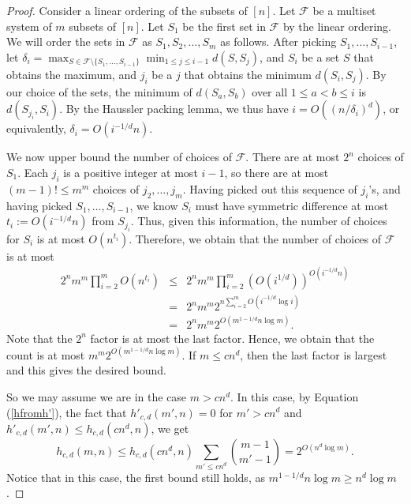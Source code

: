 \documentclass[11pt]{article}
\theoremstyle{plain}
\theoremstyle{definition}
\theoremstyle{remark}
\begin{document}
 
 \begin{proof} 
Consider a linear ordering of the subsets of $[n]$. Let $\mathcal{F}$ be a multiset system of $m$ subsets of $[n]$. Let $S_1$ be the first set in $\mathcal{F}$ by the linear ordering. We will order the sets in $\mathcal{F}$ as $S_1,S_2,\ldots,S_m$ as follows. After picking $S_1,\ldots,S_{i-1}$, let $\delta_i=\max_{S \in \mathcal{F} \setminus \{S_1,\ldots,S_{i-1}\}} \min_{1 \leq j \leq i-1} d(S,S_j)$, and $S_i$ be a set $S$ that obtains the maximum, and $j_i$ be a $j$ that obtains the minimum $d(S_i,S_j)$. By our choice of the sets, 
the minimum of $d(S_a,S_b)$ over all $1 \leq a < b \leq i$ is $d(S_{j_i},S_i)$. By the Haussler packing lemma, we thus have $i = O((n/\delta_i)^d)$, or equivalently, $\delta_i = O(i^{-1/d}n)$. 

We now upper bound the number of choices of $\mathcal{F}$. There are at most $2^n$ choices of $S_1$. Each $j_i$ is a positive integer at most $i-1$, so there are at most $(m-1)! \leq m^m$ choices of $j_2,\ldots,j_m$. Having picked out this sequence of $j_i$'s, and having picked $S_1,\ldots,S_{i-1}$, we know $S_i$ must have symmetric difference at most $t_i:=O(i^{-1/d}n)$ from $S_{j_i}$. Thus, given this information, the number of choices for $S_i$ is at most $O(n^{t_i})$. Therefore, we obtain that the number of choices of $\mathcal{F}$ is at most 
\begin{eqnarray*} 2^n m^m \prod_{i=2}^m O(n^{t_i}) & \leq &  2^n m^m \prod_{i=2}^m (O(i^{1/d}))^{O(i^{-1/d}n)}\\ &= & 2^n m^m 2^{n\sum_{i=2}^m O(i^{-1/d}\log i)} \\ & = & 2^n m^m 2^{O(m^{1-1/d} n \log m)}.\end{eqnarray*} 
Note that the $2^n$ factor is at most the last factor. Hence, we obtain that the count is at most 
$m^m2^{O(m^{1-1/d} n \log m)}$. If $m \leq cn^d$, then the last factor is largest and this gives the desired bound. 

So we may assume we are in the case $m > cn^d$. In this case, by Equation (\ref{hfromh'}), the fact that $h'_{c,d}(m',n)=0$ for $m' > cn^d$ and $h'_{c,d}(m',n) \leq h_{c,d}(cn^d,n)$, we get $$h_{c,d}(m,n) \leq h_{c,d}(cn^d,n)\sum_{m' \leq cn^d}{m-1 \choose m'-1} = 2^{O(n^d \log m)}.$$
Notice that in this case, the first bound still holds, as $m^{1-1/d}n \log m \geq n^d \log m$. 







 \end{proof}
 
\end{document}
